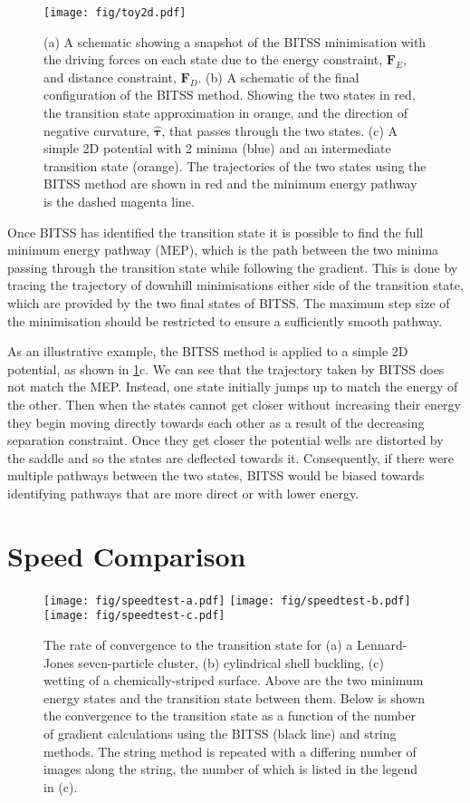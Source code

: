 \documentclass[aps,twocolumn]{revtex4}
\begin{document}
\begin{figure}[htb]
  \centering
  \texttt{[image: fig/toy2d.pdf]}
  \caption{
    (a) A schematic showing a snapshot of the BITSS minimisation with the driving forces on each state due to the energy constraint, $\bm{F}_E$, and distance constraint, $\bm{F}_D$.
    (b) A schematic of the final configuration of the BITSS method. Showing the two states in red, the transition state approximation in orange, and the direction of negative curvature, $\bm{\hat{\tau}}$, that passes through the two states. 
    (c) A simple 2D potential with 2 minima (blue) and an intermediate transition state (orange). The trajectories of the two states using the BITSS method are shown in red and the minimum energy pathway is the dashed magenta line.}
  \label{fig:toy2d}
\end{figure}

Once BITSS has identified the transition state it is possible to find the full minimum energy pathway (MEP), which is the path between the two minima passing through the transition state while following the gradient.
This is done by tracing the trajectory of downhill minimisations either side of the transition state, which are provided by the two final states of BITSS. The maximum step size of the minimisation should be restricted to ensure a sufficiently smooth pathway.

As an illustrative example, the BITSS method is applied to a simple 2D potential, as shown in \cref{fig:toy2d}c.
We can see that the trajectory taken by BITSS does not match the MEP. Instead, one state initially jumps up to match the energy of the other. Then when the states cannot get closer without increasing their energy they begin moving directly towards each other as a result of the decreasing separation constraint. Once they get closer the potential wells are distorted by the saddle and so the states are deflected towards it.
Consequently, if there were multiple pathways between the two states, BITSS would be biased towards identifying pathways that are more direct or with lower energy.


\section{Speed Comparison}
\begin{figure*}[htb]
  \centering
  \texttt{[image: fig/speedtest-a.pdf]}%
  \texttt{[image: fig/speedtest-b.pdf]}%
  \texttt{[image: fig/speedtest-c.pdf]}%
  \caption{The rate of convergence to the transition state for (a) a Lennard-Jones seven-particle cluster, (b) cylindrical shell buckling, (c) wetting of a chemically-striped surface. Above are the two minimum energy states and the transition state between them. Below is shown the convergence to the transition state as a function of the number of gradient calculations using the BITSS (black line) and string methods. The string method is repeated with a differing number of images along the string, the number of which is listed in the legend in (c).}
  \label{fig:speedtest}
\end{figure*}
\end{document}
